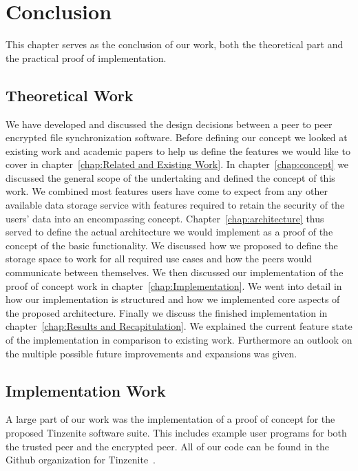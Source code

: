 \chapter{Conclusion}
\label{chap:conclusion}

This chapter serves as the conclusion of our work, both the theoretical part and the practical proof of implementation.

\section{Theoretical Work}
\label{sec:Theoretical Work}

We have developed and discussed the design decisions between a peer to peer encrypted file synchronization software.
Before defining our concept we looked at existing work and academic papers to help us define the features we would like to cover in chapter~\ref{chap:Related and Existing Work}.
In chapter~\ref{chap:concept} we discussed the general scope of the undertaking and defined the concept of this work.
We combined most features users have come to expect from any other available data storage service with features required to retain the security of the users' data into an encompassing concept.
Chapter~\ref{chap:architecture} thus served to define the actual architecture we would implement as a proof of the concept of the basic functionality.
We discussed how we proposed to define the storage space to work for all required use cases and how the peers would communicate between themselves.
We then discussed our implementation of the proof of concept work in chapter~\ref{chap:Implementation}.
We went into detail in how our implementation is structured and how we implemented core aspects of the proposed architecture.
Finally we discuss the finished implementation in chapter~\ref{chap:Results and Recapitulation}.
We explained the current feature state of the implementation in comparison to existing work.
Furthermore an outlook on the multiple possible future improvements and expansions was given.

\section{Implementation Work}
\label{sec:Implementation Work}

A large part of our work was the implementation of a proof of concept for the proposed Tinzenite software suite.
This includes example user programs for both the trusted peer and the encrypted peer.
All of our code can be found in the Github organization for Tinzenite~\cite{web:site:github:tinzenite}.

